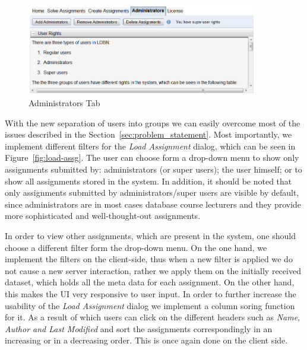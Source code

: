 \begin{figure}[h]
	\begin{center}
		\includegraphics[width=0.9\textwidth]{./img/admin-ui.png}
		\caption{Administrators Tab}
		\label{fig:admin-ui}
	\end{center}
\end{figure}

With the new separation of users into groups we can easily overcome most of 
the issues described in the Section~\ref{sec:problem_statement}.
Most importantly, we implement different filters for the \emph{Load Assignment} dialog,
which can be seen in Figure~\ref{fig:load-assg}. The user can choose form 
a drop-down menu to show only assignments submitted by: administrators 
(or super users); the user himself; or to show all assignments stored in the system. 
In addition, it should be noted that only assignments submitted
by administrators/super users are visible by default, since administrators are in most
cases database course lecturers and they provide more sophisticated and 
well-thought-out assignments. 

In order to view other assignments, which are present in the system, 
one should choose a different filter form the drop-down menu. 
On the one hand, we implement the filters on the client-side, thus when a new filter is
applied we do not cause a new server interaction, rather we apply them
on the initially received dataset, which holds all the meta data for each assignment.
On the other hand, this makes the UI very responsive to user input. 
In order to further increase the usability of the \emph{Load Assignment} dialog
we implement a column soring function for it. As a result of which users can click on
the different headers such as \emph{Name, Author and Last Modified} and sort the 
assignments correspondingly in an increasing or in a decreasing order. This is once
again done on the client side. 

